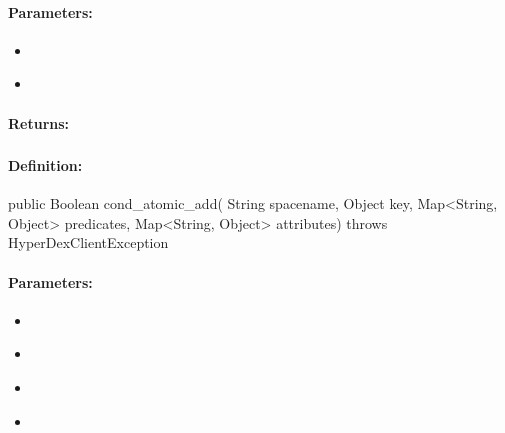 \paragraph{Parameters:}
\begin{itemize}[noitemsep]
\item {}\\

\item {}\\

\end{itemize}

\paragraph{Returns:}


\pagebreak
\subsubsection{}
\label{api:java:cond_atomic_add}


\paragraph{Definition:}
\begin{javacode}
public Boolean cond_atomic_add(
        String spacename,
        Object key,
        Map<String, Object> predicates,
        Map<String, Object> attributes) throws HyperDexClientException
\end{javacode}

\paragraph{Parameters:}
\begin{itemize}[noitemsep]
\item {}\\

\item {}\\

\item {}\\

\item {}\\

\end{itemize}

